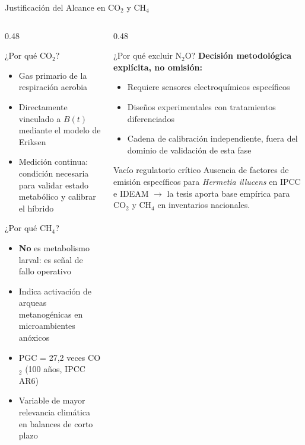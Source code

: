 \documentclass[aspectratio=169, 11pt]{beamer}
\newcommand{\BSF}{\textit{Hermetia illucens}}
\begin{document}
\begin{frame}{Justificación del Alcance en CO$_2$ y CH$_4$}
\begin{columns}[T]
\begin{column}{0.48\textwidth}
\begin{exampleblock}{¿Por qué CO$_2$?}
\begin{itemize}
    \item Gas primario de la respiración aerobia
    \item Directamente vinculado a $B(t)$ mediante el modelo de Eriksen
    \item Medición continua: condición necesaria para validar estado metabólico y calibrar el híbrido
\end{itemize}
\end{exampleblock}
\vspace{0.2cm}
\begin{exampleblock}{¿Por qué CH$_4$?}
\begin{itemize}
    \item \textbf{No} es metabolismo larval: es señal de fallo operativo
    \item Indica activación de arqueas metanogénicas en microambientes anóxicos
    \item PGC = 27,2 veces CO$_2$ (100 años, IPCC AR6)
    \item Variable de mayor relevancia climática en balances de corto plazo
\end{itemize}
\end{exampleblock}
\end{column}
\begin{column}{0.48\textwidth}
\begin{alertblock}{¿Por qué excluir N$_2$O?}
\textbf{Decisión metodológica explícita, no omisión:}
\begin{itemize}
    \item Requiere sensores electroquímicos específicos
    \item Diseños experimentales con tratamientos diferenciados
    \item Cadena de calibración independiente, fuera del dominio de validación de esta fase
\end{itemize}
\end{alertblock}
\vspace{0.2cm}
\begin{block}{Vacío regulatorio crítico}
Ausencia de factores de emisión específicos para \BSF{} en IPCC e IDEAM $\rightarrow$ la tesis aporta base empírica para CO$_2$ y CH$_4$ en inventarios nacionales.
\end{block}
\end{column}
\end{columns}
\end{frame}
\end{document}
